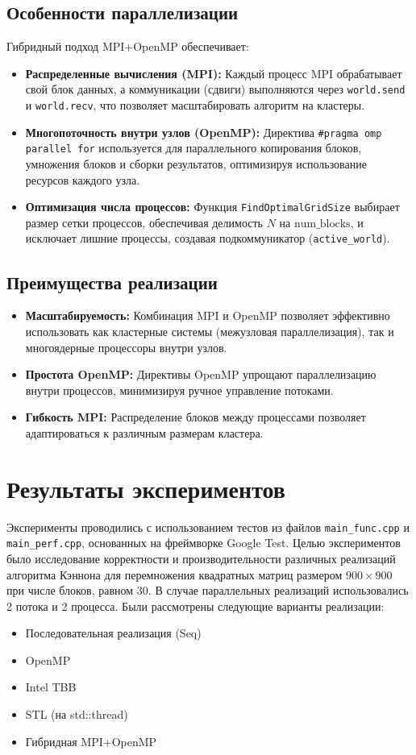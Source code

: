 \documentclass[a4paper,12pt]{article}
\begin{document}
\subsection{Особенности параллелизации}
Гибридный подход MPI+OpenMP обеспечивает:
\begin{itemize}
    \item \textbf{Распределенные вычисления (MPI):} Каждый процесс MPI обрабатывает свой блок данных, а коммуникации (сдвиги) выполняются через \texttt{world.send} и \texttt{world.recv}, что позволяет масштабировать алгоритм на кластеры.
    \item \textbf{Многопоточность внутри узлов (OpenMP):} Директива \texttt{\#pragma omp parallel for} используется для параллельного копирования блоков, умножения блоков и сборки результатов, оптимизируя использование ресурсов каждого узла.
    \item \textbf{Оптимизация числа процессов:} Функция \texttt{FindOptimalGridSize} выбирает размер сетки процессов, обеспечивая делимость \( N \) на \( \text{num\_blocks} \), и исключает лишние процессы, создавая подкоммуникатор (\texttt{active\_world}).
\end{itemize}

\subsection{Преимущества реализации}
\begin{itemize}
    \item \textbf{Масштабируемость:} Комбинация MPI и OpenMP позволяет эффективно использовать как кластерные системы (межузловая параллелизация), так и многоядерные процессоры внутри узлов.
    \item \textbf{Простота OpenMP:} Директивы OpenMP упрощают параллелизацию внутри процессов, минимизируя ручное управление потоками.
    \item \textbf{Гибкость MPI:} Распределение блоков между процессами позволяет адаптироваться к различным размерам кластера.
\end{itemize}

\section{Результаты экспериментов}

Эксперименты проводились с использованием тестов из файлов \texttt{main\_func.cpp} и \texttt{main\_perf.cpp}, основанных на фреймворке Google Test. Целью экспериментов было исследование корректности и производительности различных реализаций алгоритма Кэннона для перемножения квадратных матриц размером $900 \times 900$ при числе блоков, равном 30. В случае параллельных реализаций использовались 2 потока и 2 процесса. Были рассмотрены следующие варианты реализации:
\begin{itemize}
    \item Последовательная реализация (Seq)
    \item OpenMP
    \item Intel TBB
    \item STL (на std::thread)
    \item Гибридная MPI+OpenMP
\end{itemize}
\end{document}
